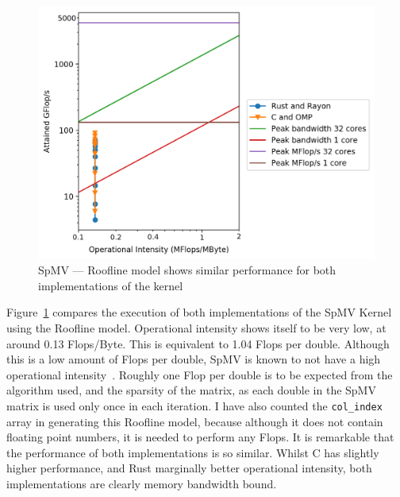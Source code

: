 \begin{figure}[h]
\centering
\includegraphics[width=.9\linewidth]{figs/sparse/roofline.png}
\caption{SpMV --- Roofline model shows similar performance for both implementations of the kernel}\label{fig:roofline}
\end{figure}

Figure~\ref{fig:roofline} compares the execution of both implementations of the SpMV Kernel using the Roofline model. Operational intensity shows itself to be very low, at around 0.13 Flops/Byte. This is equivalent to 1.04 Flops per double.
Although this is a low amount of Flops per double, SpMV is known to not have a high operational intensity~\cite{SparseArith}. Roughly one Flop per double is to be expected from the algorithm used, and the sparsity of the matrix, as each double in the SpMV matrix is used only once in each iteration. I have also counted the \texttt{col\_index} array in generating this Roofline model, because although it does not contain floating point numbers, it is needed to perform any Flops.
It is remarkable that the performance of both implementations is so similar. Whilst C has slightly higher performance, and Rust marginally better operational intensity, both implementations are clearly memory bandwidth bound. 

